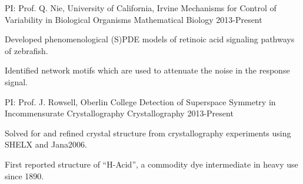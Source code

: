 \begin{cventries}
\cventry
	{PI: Prof. Q. Nie, University of California, Irvine} %
	{Mechanisms for Control of Variability in Biological Organisms} %
	{Mathematical Biology} %
	{2013-Present} %
	{
		\begin{cvitems} %
			\item {Developed phenomenological (S)PDE models of retinoic acid signaling pathways of zebrafish.}
			\item {Identified network motifs which are used to attenuate the noise in the response signal.}
		\end{cvitems}
	}
		
\cventry
	{PI: Prof. J. Rowsell, Oberlin College} %
	{Detection of Superspace Symmetry in Incommensurate Crystallography} %
	{Crystallography} %
	{2013-Present} %
	{
		\begin{cvitems} %
			\item {Solved for and refined crystal structure from crystallography experiments using SHELX and Jana2006.}
			\item {First reported structure of “H-Acid”, a commodity dye intermediate in heavy use since 1890.}
		\end{cvitems}
	}
	
\end{cventries}


